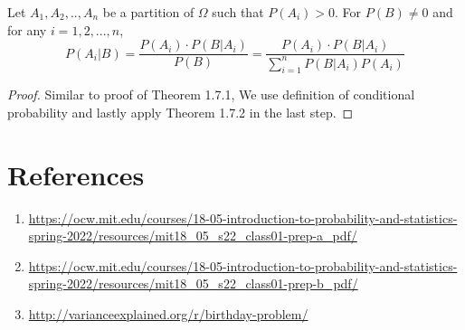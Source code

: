 \begin{theorem} Let $A_1,A_2,..,A_n$ be a partition of $\Omega$ such that $P(A_i) > 0$. For $P(B) \neq 0$ and for any $i=1,2,...,n$,
    $$ P(A_i|B) = \frac{P(A_i) \cdot P(B|A_i)}{P(B)} =  \frac{P(A_i) \cdot P(B|A_i)}{\sum_{i=1}^n P(B|A_i)P(A_i) }$$
\end{theorem}
\begin{proof}
    Similar to proof of Theorem 1.7.1, We use definition of conditional probability and  lastly apply Theorem 1.7.2  in the last step.
\end{proof}

\section{References}
\begin{enumerate}
    \item \url{https://ocw.mit.edu/courses/18-05-introduction-to-probability-and-statistics-spring-2022/resources/mit18_05_s22_class01-prep-a_pdf/}
    \item \url{https://ocw.mit.edu/courses/18-05-introduction-to-probability-and-statistics-spring-2022/resources/mit18_05_s22_class01-prep-b_pdf/}
    \item \url{http://varianceexplained.org/r/birthday-problem/}
\end{enumerate}
